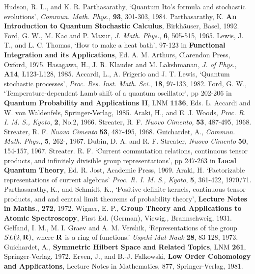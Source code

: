 \begin{thebibliography}{99}
 Hudson, R. L., and K. R. Parthasarathy, `Quantum Ito's
formula and stochastic evolutions', {\em Commun. Math. Phys.}, {\bf 93},
301-303, 1984.
 Parthasarathy, K. {\bf An Introduction to Quantum
Stochastic Calculus}, Birkh\"{a}user, Basel, 1992.
 Ford, G. W., M. Kac and P. Mazur, {\em J. Math. Phys.},
{\bf 6}, 505-515, 1965.
 Lewis, J. T., and L. C. Thomas, `How to make a heat
bath', 97-123 in {\bf Functional Integration and its Applications},
Ed. A. M. Arthurs, Clarendon Press, Oxford, 1975.
 Hasagawa, H., J. R. Klauder and M. Lakshmanan, {\em J. of
Phys.}, {\bf A14}, L123-L128, 1985.
 Accardi, L., A. Frigerio and J. T. Lewis, `Quantum
stochastic processes', {\em Proc. Res. Inst. Math. Sci.}, {\bf 18},
97-133, 1982.
 Ford, G. W., `Temperature-dependent Lamb shift of a quantum
oscillator', pp 202-206 in {\bf Quantum Probability and Applications II},
LNM {\bf 1136}, Eds. L. Accardi and W. von Waldenfels, Springer-Verlag, 1985.
 Araki, H., and E. J. Woods, {\em Proc. R. I. M. S., Kyoto},
{\bf 2}, No.2, 1966.
 Streater, R. F. {\em Nuovo Cimento,} {\bf 53}, 487-495,
1968.
 Streater, R. F. {\em Nuovo Cimento} {\bf 53}, 487-495, 1968.
 Guichardet, A., {\em Commun. Math. Phys.}, {\bf 5},
262-, 1967.
 Dubin, D. A. and R. F. Streater, {\em Nuovo Cimento} {\bf 50},
154-157, 1967.
 Streater. R. F. `Current commutation relations, continuous
tensor products, and infinitely divisible group representations', pp
247-263 in {\bf Local Quantum Theory}, Ed. R. Jost, Academic Press, 1969.
 Araki, H. `Factorizable representations of current algebras'
{\em Proc. R. I. M. S., Kyoto}, {\bf 5}, 361-422, 1970/71.
 Parthasarathy, K., and Schmidt, K., `Positive definite
kernels, continuous tensor products, and and central limit theorems of
probability theory', {\bf Lecture Notes in Maths.}, {\bf 272}, 1972.
 Wigner, E. P., {\bf Group Theory and Applications to 
Atomic Spectroscopy}, First Ed. (German), Viewig., Brannschweig, 1931.
 Gelfand, I. M., M. I. Graev and A. M. Vershik,
`Representations of the group $SL(2,{\bf R})$, where ${\bf R}$ is a ring
of functions.' {\em Uspehi-Mat-Nauk} {\bf 28}, 83-128, 1973.
 Guichardet, A., {\bf Symmetric Hilbert Space and Related
Topics}, LNM {\bf 261}, Springer-Verlag, 1972.
 Erven, J., and B.-J. Falkowski, {\bf Low Order Cohomology
and Applications}, Lecture Notes in Mathematics, 877, Springer-Verlag, 1981.

\end{thebibliography}
